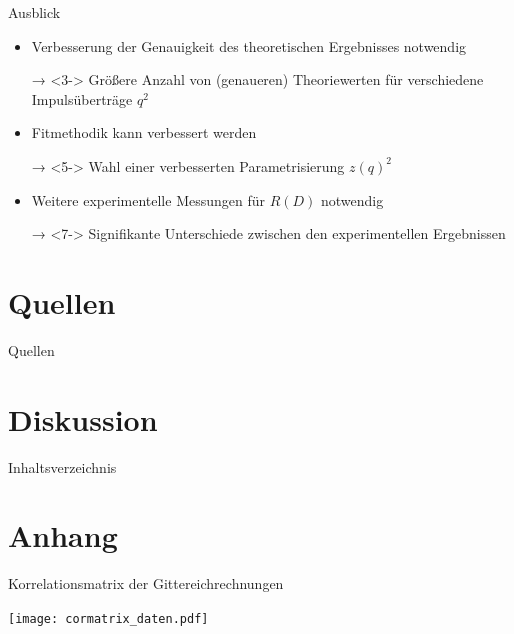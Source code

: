 \documentclass[fleqn, aspectratio=1610, professionalfonts, 9pt]{beamer}
\begin{document}
\begin{frame}{Ausblick}
  \begin{itemize}
    \setlength\itemsep{1em}
    \item<2-> Verbesserung der Genauigkeit des theoretischen Ergebnisses notwendig
    \item[→]<3-> Größere Anzahl von (genaueren) Theoriewerten für verschiedene Impulsüberträge $q^2$
    \item<4-> Fitmethodik kann verbessert werden
    \item[→]<5-> Wahl einer verbesserten Parametrisierung $z(q)^2$
    \item<6-> Weitere experimentelle Messungen für $R(D)$ notwendig
    \item[→]<7-> Signifikante Unterschiede zwischen den experimentellen Ergebnissen

  \end{itemize}
\end{frame}

\section{Quellen}

\begin{frame}{Quellen}
  \tableofcontents[currentsection,currentsubsection,
      hideothersubsections,
      sectionstyle=show/shaded,
  ]\end{frame}

\begin{frame}[allowframebreaks]
    \printbibliography
\end{frame}

\section{Diskussion}

\begin{frame}{Inhaltsverzeichnis}
  \tableofcontents[currentsection,currentsubsection,
      hideothersubsections,
      sectionstyle=show/shaded,
  ]\end{frame}



\appendix
\section{Anhang}

\begin{frame}{Korrelationsmatrix der Gittereichrechnungen}
  \begin{center}
    \texttt{[image: cormatrix\_daten.pdf]}
  \end{center}
\end{frame}
\end{document}

